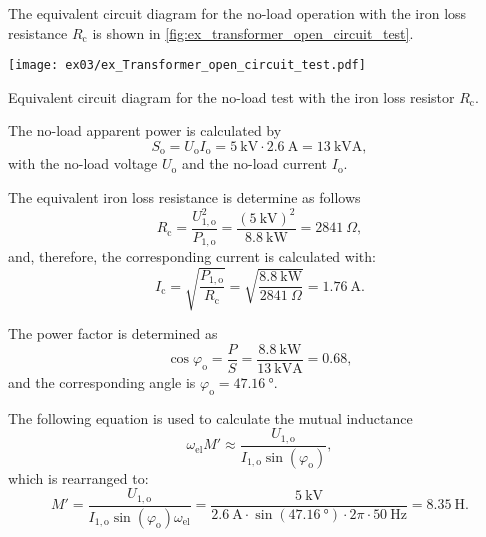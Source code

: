 \begin{solutionblock}

  The equivalent circuit diagram for the no-load operation with the iron loss resistance $R_{\mathrm{c}}$ is shown in \autoref{fig:ex_transformer_open_circuit_test}.
  \begin{solutionfigure}[ht!]
    \centering
    \texttt{[image: ex03/ex\_Transformer\_open\_circuit\_test.pdf]}
    \caption{Equivalent circuit diagram for the no-load test with the iron loss resistor $R_{\mathrm{c}}$.}
    \label{fig:ex_transformer_open_circuit_test}
  \end{solutionfigure}
  
  
  The no-load apparent power is calculated by
  \begin{equation}
    S_{\mathrm{o}} = U_{\mathrm{o}} I_{\mathrm{o}}
    = \SI{5}{\kilo\volt} \cdot \SI{2.6}{\ampere}
    = \SI{13}{\kilo\volt\ampere},
  \end{equation}
  with the no-load voltage $U_{\mathrm{o}}$ and the no-load current $I_{\mathrm{o}}$.

  The equivalent iron loss resistance is determine as follows
  \begin{equation}
    R_{\mathrm{c}} = \frac{U_{\mathrm{1,o}}^2}{P_{\mathrm{1,o}}}
    = \frac{\left(\SI{5}{\kilo\volt} \right)^2}{\SI{8.8}{\kilo\watt}}
    = \SI{2841}{\Omega},
  \end{equation}
  and, therefore, the corresponding current is calculated with:
  \begin{equation}
    I_{\mathrm{c}} = \sqrt{\frac{P_{\mathrm{1,o}}}{R_{\mathrm{c}}}}
    = \sqrt{\frac{\SI{8.8}{\kilo\watt}}{\SI{2841}{\Omega}}}
    = \SI{1.76}{\ampere}.
  \end{equation}

  The power factor is determined as
  \begin{equation}
    \cos \varphi_{\mathrm{o}} = \frac{P}{S}
    = \frac{\SI{8.8}{\kilo\watt}}{\SI{13}{\kilo\volt\ampere}}
    = 0.68,
  \end{equation}
  and the corresponding angle is $\varphi_{\mathrm{o}} = \SI{47.16}{\degree}$.

  The following equation is used to calculate the mutual inductance
  \begin{equation}
    \omega_{\mathrm{el}} M' \approx \frac{U_{\mathrm{1,o}}}{I_{\mathrm{1,o}} \sin(\varphi_{\mathrm{o}})},
  \end{equation}
  which is rearranged to:
  \begin{equation}
    M' = \frac{U_{\mathrm{1,o}}}{I_{\mathrm{1,o}} \sin(\varphi_{\mathrm{o}}) \omega_{\mathrm{el}}}
    = \frac{\SI{5}{\kilo\volt}}{\SI{2.6}{\ampere}\cdot \sin(\SI{47.16}{\degree})\cdot 2\pi \cdot \SI{50}{\hertz}}
    = \SI{8.35}{\henry}.
  \end{equation}


\end{solutionblock}

